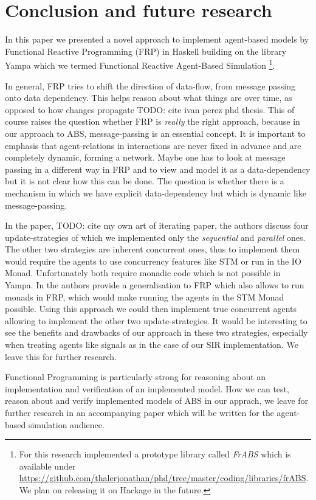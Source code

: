 \section{Conclusion and future research}
In this paper we presented a novel approach to implement agent-based models by Functional Reactive Programming (FRP) in Haskell building on the library Yampa which we termed Functional Reactive Agent-Based Simulation \footnote{For this research implemented a prototype library called \textit{FrABS} which is available under \url{https://github.com/thalerjonathan/phd/tree/master/coding/libraries/frABS}. We plan on releasing it on Hackage in the future.}.

In general, FRP tries to shift the direction of data-flow, from message passing onto data dependency. This helps reason about what things are over time, as opposed to how changes propagate TODO: cite ivan perez phd thesis. This of course raises the question whether FRP is \textit{really} the right approach, because in our approach to ABS, message-passing is an essential concept. It is important to emphasis that agent-relations in interactions are never fixed in advance and are completely dynamic, forming a network. Maybe one has to look at message passing in a different way in FRP and to view and model it as a data-dependency but it is not clear how this can be done. The question is whether there is a mechanism in which we have explicit data-dependency but which is dynamic like message-passing.

In the paper, TODO: cite my own art of iterating paper, the authors discuss four update-strategies of which we implemented only the \textit{sequential} and \textit{parallel} ones. The other two strategies are inherent concurrent ones, thus to implement them would require the agents to use concurrency features like STM or run in the IO Monad. Unfortunately both require monadic code which is not possible in Yampa. In \cite{perez_functional_2016} the authors provide a generalisation to FRP which also allows to run monads in FRP, which would make running the agents in the STM Monad possible. Using this approach we could then implement true concurrent agents allowing to implement the other two update-strategies. It would be interesting to see the benefits and drawbacks of our approach in these two strategies, especially when treating agents like signals as in the case of our SIR implementation. We leave this for further research.

Functional Programming is particularly strong for reasoning about an implementation and verification of an implemented model. How we can test, reason about and verify implemented models of ABS in our apprach, we leave for further research in an accompanying paper which will be written for the agent-based simulation audience.